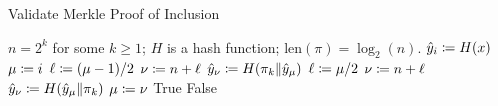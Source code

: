 \begin{algorithm}[p]
\caption{Validate Merkle Proof of Inclusion}
\label{alg:merkle_proof}
\begin{algorithmic}[1]
\Require $n = 2^{k}$ for some $k\ge1$; $H$ is a \gls{hash function}; $\text{len}(\pi) = \log_{2}(n)$.
    \State $\hat{y}_{i} \coloneqq{} H(x)$
    \State $\mu \coloneqq{} i$
            \State $\ell \coloneqq{} (\mu-1)/2$
            \State $\nu \coloneqq{} n + \ell$
            \State $\hat{y}_{\nu} \coloneqq{} H(\pi_{k}\|\hat{y}_{\mu})$
        \Else
            \State $\ell \coloneqq{} \mu/2$
            \State $\nu \coloneqq{} n + \ell$
            \State $\hat{y}_{\nu} \coloneqq{} H(\hat{y}_{\mu}\|\pi_{k})$
        \EndIf
        \State $\mu \coloneqq{} \nu$
    \EndFor
        \State \Return \textsf{True}
    \Else
        \State \Return \textsf{False}
    \EndIf
\EndProcedure
\end{algorithmic}
\end{algorithm}
